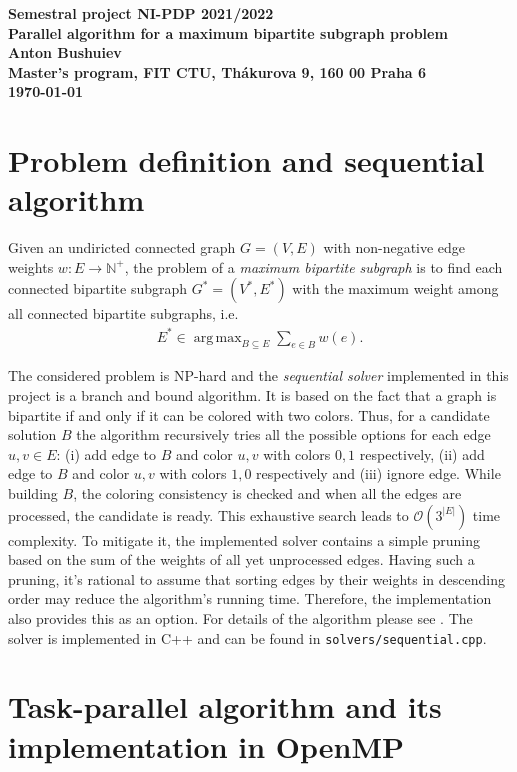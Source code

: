 \documentclass[epsf,epic,eepic,eepicemu]{article}
\DeclareMathOperator*{\argmax}{arg\,max}
\begin{document}
\begin{center}
\bf Semestral project NI-PDP 2021/2022\\[5mm]
    {\Large Parallel algorithm for a maximum bipartite subgraph problem}\\[5mm]
       Anton Bushuiev\\[2mm]
Master's program, FIT CTU, Th\'akurova 9, 160 00 Praha 6\\[2mm]
\today
\end{center}

\section{Problem definition and sequential algorithm}
\label{sec:sequential}

Given an undiricted connected graph $G=(V, E)$ with non-negative edge weights $w: E \to \mathbb{N}^+$, the problem of a \textit{maximum bipartite subgraph} is to find each connected bipartite subgraph $G^*=(V^*, E^*)$ with the maximum weight among all connected bipartite subgraphs, i.e.
\begin{align}
	E^* \in \argmax_{B \subseteq E}{\sum_{e \in B}{w(e)}}.
\end{align}

The considered problem is NP-hard \cite{gutin2021} and the \textit{sequential solver} implemented in this project is a branch and bound algorithm. It is based on the fact that a graph is bipartite if and only if it can be colored with two colors. Thus, for a candidate solution $B$ the algorithm recursively tries all the possible options for each edge ${u, v} \in E$: (i) add edge to $B$ and color $u, v$ with colors $0, 1$ respectively, (ii) add edge to $B$ and color $u, v$ with colors $1, 0$ respectively and (iii)  ignore edge. While building $B$, the coloring consistency is checked and when all the edges are processed, the candidate is ready. This exhaustive search leads to $\mathcal{O}(3^{|E|})$ time complexity. To mitigate it, the implemented solver contains a simple pruning based on the sum of the weights of all yet unprocessed edges. Having such a pruning, it's rational to assume that sorting edges by their weights in descending order may reduce the algorithm's running time. Therefore, the implementation also provides this as an option. For details of the algorithm please see . The solver is implemented in C++ and can be found in \texttt{solvers/sequential.cpp}.

\section{Task-parallel algorithm and its implementation in OpenMP}
\end{document}
